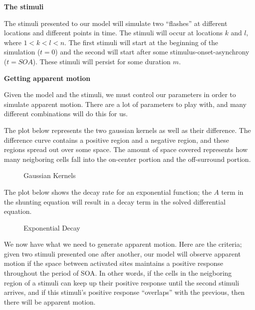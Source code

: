 \documentclass[a4paper,12pt]{article}
\begin{document}
{\bf The stimuli}
\smallskip

The stimuli presented to our model will simulate two ``flashes'' at different locations and different points in time. The stimuli will occur at locations $k$ and $l$, where $1<k<l<n$. The first stimuli will start at the beginning of the simulation ($t=0$) and the second will start after some stimulus-onset-asynchrony ($t=SOA$). These stimuli will persist for some duration $m$. 
\vfil\eject

{\bf Getting apparent motion}
\smallskip

Given the model and the stimuli, we must control our parameters in order to simulate apparent motion. There are a lot of parameters to play with, and many different combinations will do this for us. 
\smallskip

The plot below represents the two gaussian kernels as well as their difference. The difference curve contains a positive region and a negative region, and these regions spread out over some space. The amount of space covered represents how many neigboring cells fall into the on-center portion and the off-surround portion. 

\begin{center}
  \begin{figure}[h!]
    \caption{\label{pict1}Gaussian Kernels}
  \end{figure}
\end{center}

\vfil\eject

The plot below shows the decay rate for an exponential function; the $A$ term in the shunting equation will result in a decay term in the solved differential equation. 

\begin{center}
  \begin{figure}[h!]
    \caption{\label{pict1}Exponential Decay}
  \end{figure}
\end{center}

We now have what we need to generate apparent motion. Here are the criteria; given two stimuli presented one after another, our model will observe apparent motion if the space between activated sites maintains a positive response throughout the period of SOA. In other words, if the cells in the neigboring region of a stimuli can keep up their positive response until the second stimuli arrives, and if this stimuli's positive response ``overlaps'' with the previous, then there will be apparent motion. 
\vfil\eject
\end{document}
